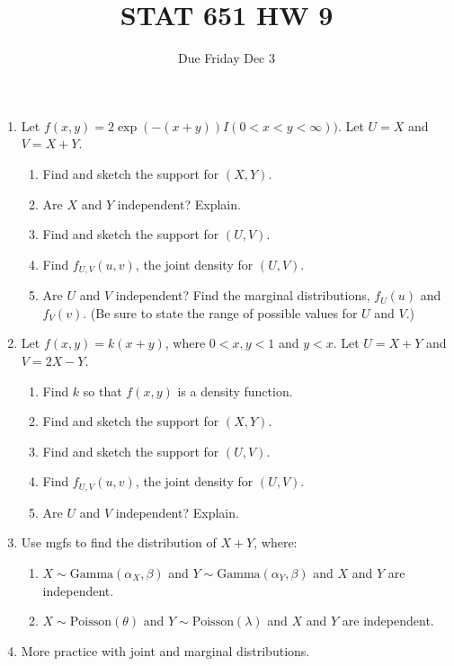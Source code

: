\documentclass[12pt]{article}
\begin{document}
\title{STAT 651 HW 9}
\author{Due Friday Dec 3}
\date{}
\maketitle

\begin{enumerate}
\item
  Let $f(x,y) = 2\exp(-(x+y))I(0 < x < y < \infty))$.  Let $U = X$ and $V=X+Y$.
  \begin{enumerate}
  \item Find and sketch the support for $(X,Y)$.
  \item Are $X$ and $Y$ independent?  Explain.
  \item Find and sketch the support for $(U,V)$.
  \item Find $f_{U,V}(u,v)$, the joint density for $(U,V)$.
  \item Are $U$ and $V$ independent?  Find the marginal distributions, $f_U(u)$ and $f_V(v)$.  (Be sure to state the range of possible values for $U$ and $V$.)
  \end{enumerate}

\item
  Let $f(x,y) = k(x+y)$, where $0 < x,y < 1$ and $y<x$.
  Let $U = X+Y$ and $V = 2X-Y$.
  \begin{enumerate}
  \item Find $k$ so that $f(x,y)$ is a density function.
  \item Find and sketch the support for $(X,Y)$.
  \item Find and sketch the support for $(U,V)$.
  \item Find $f_{U,V}(u,v)$, the joint density for $(U,V)$.
  \item Are $U$ and $V$ independent?  Explain.
  \end{enumerate}

\item Use mgfs to find the distribution of $X+Y$, where:
\begin{enumerate}
\item $X \sim \text{Gamma}(\alpha_X,\beta)$ and
    $Y \sim \text{Gamma}(\alpha_Y,\beta)$ and $X$ and $Y$ are independent.
\item $X \sim \text{Poisson}(\theta)$ and $Y \sim \text{Poisson}(\lambda)$
    and $X$ and $Y$ are independent.
\end{enumerate}

\item More practice with joint and marginal distributions.


\end{enumerate}
\end{document}
